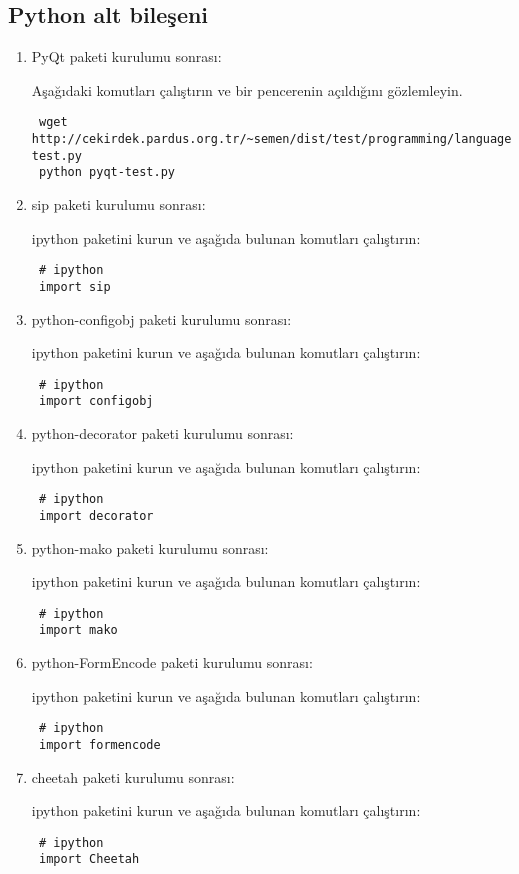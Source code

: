 \documentclass[a4paper,10pt]{article}
\begin{document}
\subsection{Python alt bileşeni}
\begin{enumerate}
\item PyQt paketi kurulumu sonrası:

Aşağıdaki komutları çalıştırın ve bir pencerenin açıldığını gözlemleyin.
\begin{verbatim}
 wget http://cekirdek.pardus.org.tr/~semen/dist/test/programming/language/python/pyqt-test.py
 python pyqt-test.py
\end{verbatim}


\item sip paketi kurulumu sonrası:

ipython paketini kurun ve aşağıda bulunan komutları çalıştırın:
\begin{verbatim}
 # ipython
 import sip
\end{verbatim}

\item python-configobj paketi kurulumu sonrası:

ipython paketini kurun ve aşağıda bulunan komutları çalıştırın:
\begin{verbatim}
 # ipython
 import configobj
\end{verbatim}
\item python-decorator paketi kurulumu sonrası:

ipython paketini kurun ve aşağıda bulunan komutları çalıştırın:
\begin{verbatim}
 # ipython
 import decorator
\end{verbatim}
\item python-mako paketi kurulumu sonrası:

ipython paketini kurun ve aşağıda bulunan komutları çalıştırın:
\begin{verbatim}
 # ipython
 import mako
\end{verbatim}

\item python-FormEncode paketi kurulumu sonrası:

ipython paketini kurun ve aşağıda bulunan komutları çalıştırın:
\begin{verbatim}
 # ipython
 import formencode
\end{verbatim}

\item cheetah  paketi kurulumu sonrası:

ipython paketini kurun ve aşağıda bulunan komutları çalıştırın:
\begin{verbatim}
 # ipython
 import Cheetah
\end{verbatim}



\end{enumerate}
\end{document}

